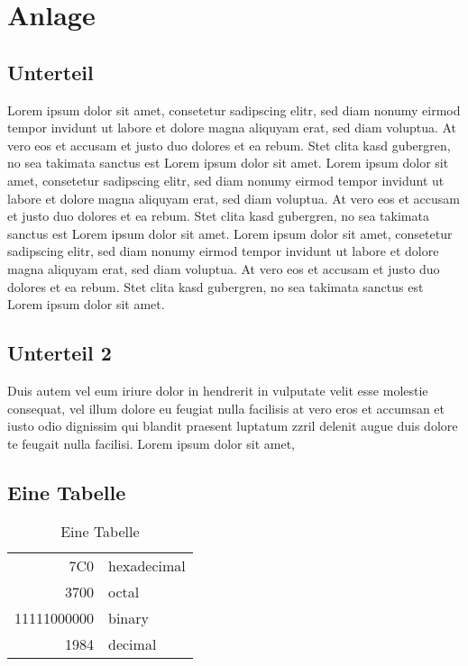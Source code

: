 \section{Anlage}
\subsection{Unterteil}
Lorem ipsum dolor sit amet, consetetur sadipscing elitr, sed diam nonumy eirmod tempor invidunt ut labore et dolore magna aliquyam erat, sed diam voluptua. At vero eos et accusam et justo duo dolores et ea rebum. Stet clita kasd gubergren, no sea takimata sanctus est Lorem ipsum dolor sit amet. Lorem ipsum dolor sit amet, consetetur sadipscing elitr, sed diam nonumy eirmod tempor invidunt ut labore et dolore magna aliquyam erat, sed diam voluptua. At vero eos et accusam et justo duo dolores et ea rebum. Stet clita kasd gubergren, no sea takimata sanctus est Lorem ipsum dolor sit amet. Lorem ipsum dolor sit amet, consetetur sadipscing elitr, sed diam nonumy eirmod tempor invidunt ut labore et dolore magna aliquyam erat, sed diam voluptua. At vero eos et accusam et justo duo dolores et ea rebum. Stet clita kasd gubergren, no sea takimata sanctus est Lorem ipsum dolor sit amet.   

\subsection{Unterteil 2}
Duis autem vel eum iriure dolor in hendrerit in vulputate velit esse molestie consequat, vel illum dolore eu feugiat nulla facilisis at vero eros et accumsan et iusto odio dignissim qui blandit praesent luptatum zzril delenit augue duis dolore te feugait nulla facilisi. Lorem ipsum dolor sit amet,

\subsection{Eine Tabelle}

\begin{table}[!ht]
	\centering
	\begin{tabular}{|r|l|}
		\hline
		7C0 & hexadecimal \\
		3700 & octal \\ \cline{2-2}
		11111000000 & binary\\
		\hline \hline
		1984 & decimal \\
		\hline
	\end{tabular}
	\caption[Eine Tabelle]{Eine Tabelle\footnotemark}
	\label{tab:testtab1}
\end{table}
